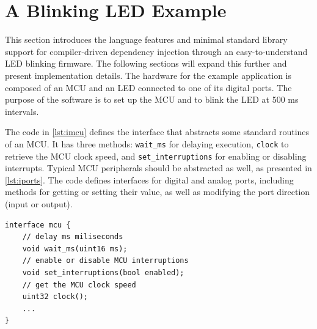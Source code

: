 \documentclass[10pt,sigplan,screen,anonymous]{acmart}
\begin{document}


\section{A Blinking LED Example} \label{sec:ledblink}
 
This section introduces the language features and minimal standard library support for compiler-driven dependency injection through an easy-to-understand LED blinking firmware. The following sections will expand this further and present implementation details. The hardware for the example application is composed of an MCU and an LED connected to one of its digital ports. The purpose of the software is to set up the MCU and to blink the LED at 500 ms intervals.

The code in \autoref{lst:imcu} defines the interface that abstracts some standard routines of an MCU. It has three methods: {\tt wait\_ms} for delaying execution, {\tt clock} to retrieve the MCU clock speed, and {\tt set\_interruptions} for enabling or disabling interrupts. Typical MCU peripherals should be abstracted as well, as presented in \autoref{lst:iports}. The code defines interfaces for digital and analog ports, including methods for getting or setting their value, as well as modifying the port direction (input or output).



\begin{lstlisting}[language=rob, caption=An example MCU interface, label=lst:imcu]
interface mcu {
	// delay ms miliseconds
	void wait_ms(uint16 ms);
	// enable or disable MCU interruptions
	void set_interruptions(bool enabled);
	// get the MCU clock speed
	uint32 clock();
	...
}
\end{lstlisting}
\end{document}
